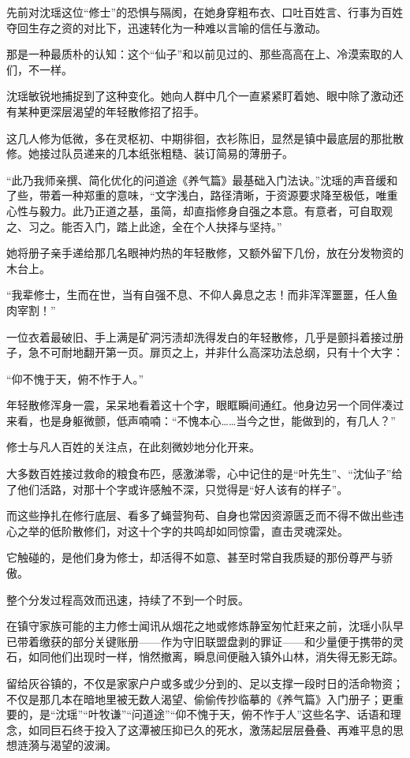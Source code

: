 先前对沈瑶这位“修士”的恐惧与隔阂，在她身穿粗布衣、口吐百姓言、行事为百姓夺回生存之资的对比下，迅速转化为一种难以言喻的信任与激动。

那是一种最质朴的认知：这个“仙子”和以前见过的、那些高高在上、冷漠索取的人们，不一样。

沈瑶敏锐地捕捉到了这种变化。她向人群中几个一直紧紧盯着她、眼中除了激动还有某种更深层渴望的年轻散修招了招手。

这几人修为低微，多在灵枢初、中期徘徊，衣衫陈旧，显然是镇中最底层的那批散修。她接过队员递来的几本纸张粗糙、装订简易的薄册子。

“此乃我师亲撰、简化优化的问道途《养气篇》最基础入门法诀。”沈瑶的声音缓和了些，带着一种郑重的意味，“文字浅白，路径清晰，于资源要求降至极低，唯重心性与毅力。此乃正道之基，虽简，却直指修身自强之本意。有意者，可自取观之、习之。能否入门，踏上此途，全在个人抉择与坚持。”

她将册子亲手递给那几名眼神灼热的年轻散修，又额外留下几份，放在分发物资的木台上。

“我辈修士，生而在世，当有自强不息、不仰人鼻息之志！而非浑浑噩噩，任人鱼肉宰割！”

一位衣着最破旧、手上满是矿洞污渍却洗得发白的年轻散修，几乎是颤抖着接过册子，急不可耐地翻开第一页。扉页之上，并非什么高深功法总纲，只有十个大字：

“仰不愧于天，俯不怍于人。”

年轻散修浑身一震，呆呆地看着这十个字，眼眶瞬间通红。他身边另一个同伴凑过来看，也是身躯微颤，低声喃喃：“不愧本心……当今之世，能做到的，有几人？”

修士与凡人百姓的关注点，在此刻微妙地分化开来。

大多数百姓接过救命的粮食布匹，感激涕零，心中记住的是“叶先生”、“沈仙子”给了他们活路，对那十个字或许感触不深，只觉得是“好人该有的样子”。

而这些挣扎在修行底层、看多了蝇营狗苟、自身也常因资源匮乏而不得不做出些违心之举的低阶散修们，对这十个字的共鸣却如同惊雷，直击灵魂深处。

它触碰的，是他们身为修士，却活得不如意、甚至时常自我质疑的那份尊严与骄傲。

整个分发过程高效而迅速，持续了不到一个时辰。

在镇守家族可能的主力修士闻讯从烟花之地或修炼静室匆忙赶来之前，沈瑶小队早已带着缴获的部分关键账册——作为守旧联盟盘剥的罪证——和少量便于携带的灵石，如同他们出现时一样，悄然撤离，瞬息间便融入镇外山林，消失得无影无踪。

留给灰谷镇的，不仅是家家户户或多或少分到的、足以支撑一段时日的活命物资；不仅是那几本在暗地里被无数人渴望、偷偷传抄临摹的《养气篇》入门册子；更重要的，是“沈瑶”“叶牧谦”“问道途”“仰不愧于天，俯不怍于人”这些名字、话语和理念，如同巨石终于投入了这潭被压抑已久的死水，激荡起层层叠叠、再难平息的思想涟漪与渴望的波澜。

